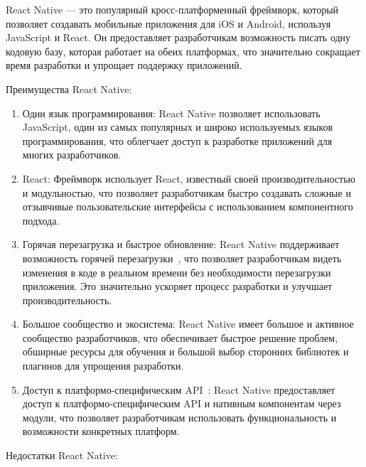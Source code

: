 \documentclass[14pt, russian]{scrartcl}
\begin{document}
React Native --- это популярный кросс-платформенный фреймворк, который позволяет создавать мобильные приложения для iOS и Android, используя JavaScript и React. Он предоставляет разработчикам возможность писать одну кодовую базу, которая работает на обеих платформах, что значительно сокращает время разработки и упрощает поддержку приложений.

Преимущества React Native:

\begin{enumerate}
    \item Один язык программирования: React Native позволяет использовать JavaScript, один из самых популярных и широко используемых языков программирования, что облегчает доступ к разработке приложений для многих разработчиков.
    \item React: Фреймворк использует React, известный своей производительностью и модульностью, что позволяет разработчикам быстро создавать сложные и отзывчивые пользовательские интерфейсы с использованием компонентного подхода.
    \item Горячая перезагрузка и быстрое обновление: React Native поддерживает возможность горячей перезагрузки~\cite{rnHotReload}, что позволяет разработчикам видеть изменения в коде в реальном времени без необходимости перезагрузки приложения. Это значительно ускоряет процесс разработки и улучшает производительность.
    \item Большое сообщество и экосистема: React Native имеет большое и активное сообщество разработчиков, что обеспечивает быстрое решение проблем, обширные ресурсы для обучения и большой выбор сторонних библиотек и плагинов для упрощения разработки.
    \item Доступ к платформо-специфическим API~\cite{rnPlatform}: React Native предоставляет доступ к платформо-специфическим API и нативным компонентам через модули, что позволяет разработчикам использовать функциональность и возможности конкретных платформ.
\end{enumerate}

Недостатки React Native:
\end{document}
